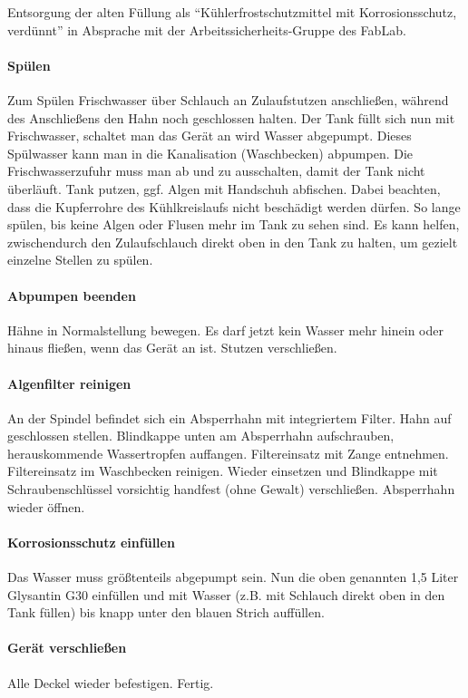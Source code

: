 \documentclass{\basedir/fablab-document}
\begin{document}
Entsorgung der alten Füllung als \enquote{Kühlerfrostschutzmittel mit Korrosionsschutz, verdünnt} in Absprache mit der Arbeitssicherheits-Gruppe des FabLab.

\paragraph{Spülen} Zum Spülen Frischwasser über Schlauch an Zulaufstutzen anschließen, während des Anschließens den Hahn noch geschlossen halten. Der Tank füllt sich nun mit Frischwasser, schaltet man das Gerät an wird Wasser abgepumpt. Dieses Spülwasser kann man in die Kanalisation (Waschbecken) abpumpen. Die Frischwasserzufuhr muss man ab und zu ausschalten, damit der Tank nicht überläuft. Tank putzen, ggf. Algen mit Handschuh abfischen. Dabei beachten, dass die Kupferrohre des Kühlkreislaufs nicht beschädigt werden dürfen.  So lange spülen, bis keine Algen oder Flusen mehr im Tank zu sehen sind. Es kann helfen, zwischendurch den Zulaufschlauch direkt oben in den Tank zu halten, um gezielt einzelne Stellen zu spülen.

\paragraph{Abpumpen beenden} Hähne in Normalstellung bewegen. Es darf jetzt kein Wasser mehr hinein oder hinaus fließen, wenn das Gerät an ist. Stutzen verschließen.

\paragraph{Algenfilter reinigen} An der Spindel befindet sich ein Absperrhahn mit integriertem Filter. Hahn auf geschlossen stellen. Blindkappe unten am Absperrhahn aufschrauben, herauskommende Wassertropfen auffangen. Filtereinsatz mit Zange entnehmen. Filtereinsatz im Waschbecken reinigen. Wieder einsetzen und Blindkappe mit Schraubenschlüssel vorsichtig handfest (ohne Gewalt) verschließen. Absperrhahn wieder öffnen.

\paragraph{Korrosionsschutz einfüllen} Das Wasser muss größtenteils abgepumpt sein. Nun die oben genannten 1,5 Liter Glysantin G30 einfüllen und mit Wasser (z.B. mit Schlauch direkt oben in den Tank füllen) bis knapp unter den blauen Strich auffüllen.

\paragraph{Gerät verschließen} Alle Deckel wieder befestigen. Fertig.
\end{document}
